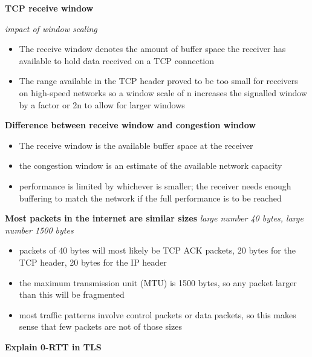 \documentclass{article}
\begin{document}
\textbf{TCP receive window}

\textit{impact of window scaling}
\begin{itemize}
    \item The receive window denotes the amount of buffer space the receiver has available to hold
    data received on a TCP connection
    \item The range available in the TCP header proved to be too small for receivers on high-speed
    networks so a window scale of n increases the signalled window by a factor or 2n
    to allow for larger windows
\end{itemize}


\textbf{Difference between receive window and congestion window}
\begin{itemize}
    \item The receive window is the available buffer space at the receiver
    \item the congestion window is an estimate of the available network capacity
    \item performance is limited by whichever is smaller; the receiver needs enough buffering to match the network if the
    full performance is to be reached
\end{itemize}

\textbf{Most packets in the internet are similar sizes}
\textit{large number 40 bytes, large number 1500 bytes}
\begin{itemize}
    \item packets of 40 bytes will most likely be TCP ACK packets, 20 bytes for the TCP header, 20 bytes for the IP header
    \item the maximum transmission unit (MTU) is 1500 bytes, so any packet larger than this will be fragmented
    \item most traffic patterns involve control packets or data packets, so this makes sense that few packets are not of those sizes
\end{itemize}

\textbf{Explain 0-RTT in TLS}
\end{document}
